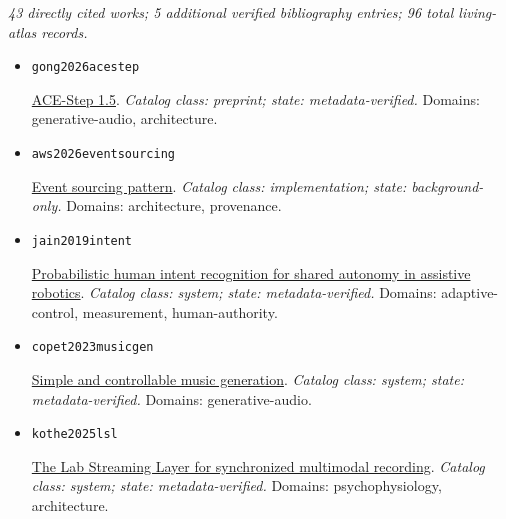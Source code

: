 
\noindent\textit{43 directly cited works; 5 additional verified bibliography entries; 96 total living-atlas records.}

\begin{itemize}[leftmargin=1.25em,itemsep=0.75em]
  \item \texttt{gong2026acestep}\par \href{https://arxiv.org/abs/2602.00744}{ACE-Step 1.5}.
  \textit{Catalog class: preprint; state: metadata-verified.} Domains: generative-audio, architecture.
  \item \texttt{aws2026eventsourcing}\par \href{https://docs.aws.amazon.com/prescriptive-guidance/latest/cloud-design-patterns/event-sourcing-pattern.html}{Event sourcing pattern}.
  \textit{Catalog class: implementation; state: background-only.} Domains: architecture, provenance.
  \item \texttt{jain2019intent}\par \href{https://doi.org/10.1145/3359614}{Probabilistic human intent recognition for shared autonomy in assistive robotics}.
  \textit{Catalog class: system; state: metadata-verified.} Domains: adaptive-control, measurement, human-authority.
  \item \texttt{copet2023musicgen}\par \href{https://arxiv.org/abs/2306.05284}{Simple and controllable music generation}.
  \textit{Catalog class: system; state: metadata-verified.} Domains: generative-audio.
  \item \texttt{kothe2025lsl}\par \href{https://doi.org/10.1162/IMAG.a.136}{The Lab Streaming Layer for synchronized multimodal recording}.
  \textit{Catalog class: system; state: metadata-verified.} Domains: psychophysiology, architecture.
\end{itemize}
